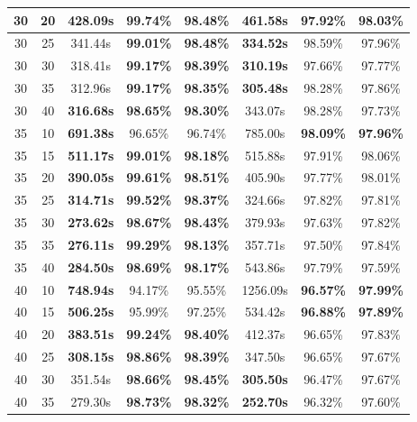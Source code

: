 \begin{table}[H]
\begin{tabular}{|c|c|c|c|c|c|c|c|}
\hline
30 & 20 & \textbf{428.09s} & \textbf{99.74\%} & \textbf{98.48\%} & 461.58s & 97.92\% & 98.03\%  \\
\hline
30 & 25 & 341.44s & \textbf{99.01\%} & \textbf{98.48\%} & \textbf{334.52s} & 98.59\% & 97.96\%  \\
\hline
30 & 30 & 318.41s & \textbf{99.17\%} & \textbf{98.39\%} & \textbf{310.19s} & 97.66\% & 97.77\%  \\
\hline
30 & 35 & 312.96s & \textbf{99.17\%} & \textbf{98.35\%} & \textbf{305.48s} & 98.28\% & 97.86\%  \\
\hline
30 & 40 & \textbf{316.68s} & \textbf{98.65\%} & \textbf{98.30\%} & 343.07s & 98.28\% & 97.73\%  \\
\hline
35 & 10 & \textbf{691.38s} & 96.65\% & 96.74\% & 785.00s & \textbf{98.09\%} & \textbf{97.96\%}  \\
\hline
35 & 15 & \textbf{511.17s} & \textbf{99.01\%} & \textbf{98.18\%} & 515.88s & 97.91\% & 98.06\%  \\
\hline
35 & 20 & \textbf{390.05s} & \textbf{99.61\%} & \textbf{98.51\%} & 405.90s & 97.77\% & 98.01\%  \\
\hline
35 & 25 & \textbf{314.71s} & \textbf{99.52\%} & \textbf{98.37\%} & 324.66s & 97.82\% & 97.81\%  \\
\hline
35 & 30 & \textbf{273.62s} & \textbf{98.67\%} & \textbf{98.43\%} & 379.93s & 97.63\% & 97.82\%  \\
\hline
35 & 35 & \textbf{276.11s} & \textbf{99.29\%} & \textbf{98.13\%} & 357.71s & 97.50\% & 97.84\%  \\
\hline
35 & 40 & \textbf{284.50s} & \textbf{98.69\%} & \textbf{98.17\%} & 543.86s & 97.79\% & 97.59\%  \\
\hline
40 & 10 & \textbf{748.94s} & 94.17\% & 95.55\% & 1256.09s & \textbf{96.57\%} & \textbf{97.99\%}  \\
\hline
40 & 15 & \textbf{506.25s} & 95.99\% & 97.25\% & 534.42s & \textbf{96.88\%} & \textbf{97.89\%}  \\
\hline
40 & 20 & \textbf{383.51s} & \textbf{99.24\%} & \textbf{98.40\%} & 412.37s & 96.65\% & 97.83\%  \\
\hline
40 & 25 & \textbf{308.15s} & \textbf{98.86\%} & \textbf{98.39\%} & 347.50s & 96.65\% & 97.67\%  \\
\hline
40 & 30 & 351.54s & \textbf{98.66\%} & \textbf{98.45\%} & \textbf{305.50s} & 96.47\% & 97.67\%  \\
\hline
40 & 35 & 279.30s & \textbf{98.73\%} & \textbf{98.32\%} & \textbf{252.70s} & 96.32\% & 97.60\%  \\

\end{tabular}
\end{table}
